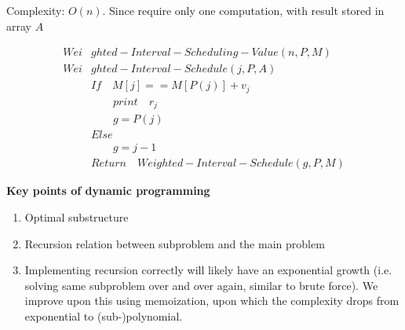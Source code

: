 \documentclass[11pt]{article}
\begin{document}
\begin{solution}
  Complexity: $O(n)$. Since require only one computation, with result stored in array $A$


  \begin{align*}
    Wei&ghted-Interval-Scheduling-Value(n, P, M)\\
    Wei&ghted-Interval-Schedule(j, P, A)\\
    &If\quad M[j] == M[P(j)] + v_j\\
    &\quad \quad print \quad r_j\\
    &\quad \quad g = P(j)\\
    &Else\\
    &\quad \quad g = j - 1\\
    &Return \quad Weighted-Interval-Schedule(g, P, M)
  \end{align*}
\end{solution}

\textbf{Key points of dynamic programming}
\begin{enumerate}
  \item Optimal substructure
  \item Recursion relation between subproblem and the main problem
  \item Implementing recursion correctly will likely have an exponential growth (i.e. solving same subproblem over and over again, similar to brute force). We improve upon this using memoization, upon which the complexity drops from exponential to (sub-)polynomial.
\end{enumerate}
\end{document}
